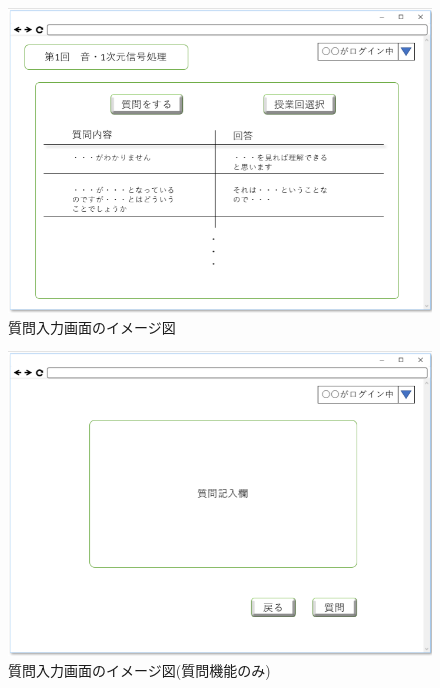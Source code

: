 \begin{figure}[phtbp]
  \begin{center}
    \includegraphics[width=1\linewidth,clip]{./img/36.png}
    \caption{質問入力画面のイメージ図}\label{fig:36}
  \end{center}
\end{figure}

\begin{figure}[phtbp]
  \begin{center}
    \includegraphics[width=1\linewidth,clip]{./img/37.png}
    \caption{質問入力画面のイメージ図(質問機能のみ)}\label{fig:37}
  \end{center}
\end{figure}

\newpage

